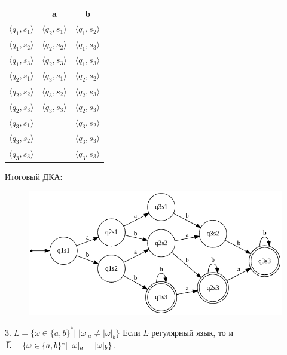 \documentclass[a4paper,12pt]{article}
\begin{document}
\begin{center}
\begin{tabular}{ |c|c|c| } 
\hline
  & a & b \\ [0.5ex] 
 \hline
 $\langle q_1 , s_1 \rangle$ & $\langle q_2 , s_1 \rangle$ & $\langle q_1 , s_2 \rangle$ \\ 
 $\langle q_1 , s_2 \rangle $ & $\langle q_2 , s_2 \rangle$ & $\langle q_1 , s_3 \rangle$ \\ 
 $\langle q_1 , s_3 \rangle $ & $\langle q_2 , s_3 \rangle$ & $\langle q_1 , s_3 \rangle$ \\ 
 $\langle q_2 , s_1 \rangle $ & $\langle q_3 , s_1 \rangle$ & $\langle q_2 , s_2 \rangle$ \\ 
 $\langle q_2 , s_2 \rangle $ & $\langle q_3 , s_2 \rangle$ & $\langle q_2 , s_3 \rangle$ \\
 $\langle q_2 , s_3 \rangle $ & $\langle q_3 , s_3 \rangle$ & $\langle q_2 , s_3 \rangle$ \\
 $\langle q_3 , s_1 \rangle $ &  & $\langle q_3 , s_2 \rangle$ \\
 $\langle q_3 , s_2 \rangle $ &  & $\langle q_3 , s_3 \rangle$ \\
 $\langle q_3 , s_3 \rangle $ &  & $\langle q_3 , s_3 \rangle$ \\
 \hline
\end{tabular}
\end{center}
\endgroup
Итоговый ДКА:\newline
\begin{figure}[h]
\centering
\includegraphics[scale=0.6]{1_2_3}
\end{figure}\newline
$3.\;L = {\{\omega \in \{a,b\}^*|\;|\omega|_a \ne |\omega|_b\}}$\newline
Если $L$ регулярный язык, то и $\overline{\rm L} = {\{\omega \in \{a,b\}^*|\;|\omega|_a = |\omega|_b\}}$.\newline
\end{document}
